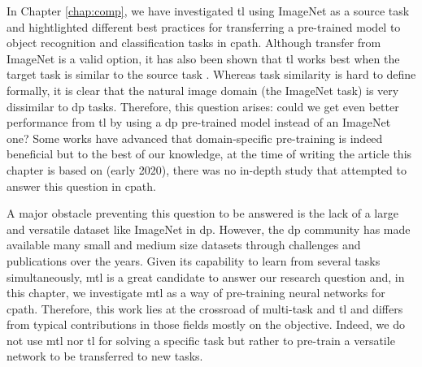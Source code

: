 
In Chapter \ref{chap:comp}, we have investigated \acrlong{tl} using ImageNet \cite{deng2009imagenet} as a source task and hightlighted different best practices for transferring a pre-trained model to object recognition and classification tasks in \acrlong{cpath}. Although transfer from ImageNet is a valid option, it has also been shown that \acrlong{tl} works best when the target task is similar to the source task \cite{yosinski2014transferable,mensink2021factors}. Whereas task similarity is hard to define formally, it is clear that the natural image domain (\ie the ImageNet task) is very dissimilar to \acrlong{dp} tasks. Therefore, this question arises: could we get even better performance from \acrlong{tl} by using a \acrlong{dp} pre-trained model instead of an ImageNet one? Some works \cite{khan2019improving, medela2019few, kraus2017automated, shang2019and} have advanced that domain-specific pre-training is indeed beneficial but to the best of our knowledge, at the time of writing the article this chapter is based on (early 2020), there was no in-depth study that attempted to answer this question in \acrlong{cpath}. 

A major obstacle preventing this question to be answered is the lack of a large and versatile dataset like ImageNet in \acrlong{dp}. However, the \acrlong{dp} community has made available many small and medium size datasets through challenges and publications over the years. Given its capability to learn from several tasks simultaneously, \acrlong{mtl} is a great candidate to answer our research question and, in this chapter, we investigate \acrlong{mtl} as a way of pre-training neural networks for \acrlong{cpath}. Therefore, this work lies at the crossroad of multi-task and \acrlong{tl} and differs from typical contributions in those fields mostly on the objective. Indeed, we do not use \acrlong{mtl} nor \acrlong{tl} for solving a specific task but rather to pre-train a versatile network to be transferred to new tasks. 


